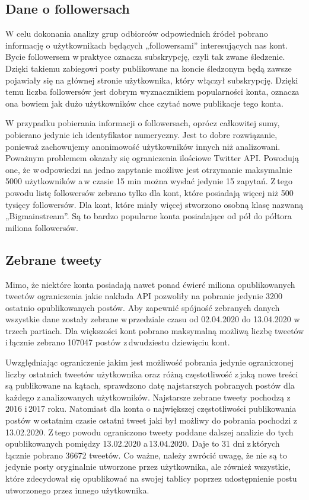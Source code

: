 \subsection{Dane o followersach}
W celu dokonania analizy grup odbiorców odpowiednich źródeł pobrano informację o użytkownikach będących „followersami” interesujących nas kont. Bycie followersem w\,praktyce oznacza subskrypcję, czyli tak zwane śledzenie. Dzięki takiemu zabiegowi posty publikowane na koncie śledzonym będą zawsze pojawiały się na głównej stronie użytkownika, który włączył subskrypcję. Dzięki temu liczba followersów jest dobrym wyznacznikiem popularności konta, oznacza ona bowiem jak dużo użytkowników chce czytać nowe publikacje tego konta. 
\par
W przypadku pobierania informacji o followersach, oprócz całkowitej sumy, pobierano jedynie ich identyfikator numeryczny. Jest to dobre rozwiązanie, ponieważ zachowujemy anonimowość użytkowników innych niż analizowani. Poważnym problemem okazały się ograniczenia ilościowe Twitter API. Powodują one, że w\,odpowiedzi na jedno zapytanie możliwe jest otrzymanie maksymalnie 5000 użytkowników a\,w czasie 15 min można wysłać jedynie 15 zapytań. Z\,tego powodu listę followersów zebrano tylko dla kont, które posiadają więcej niż 500 tysięcy followersów. Dla kont, które miały więcej stworzono osobną klasę nazwaną „Bigmainstream”. Są to bardzo popularne konta posiadające od pół do półtora miliona followersów. 
\subsection{Zebrane tweety}
Mimo, że niektóre konta posiadają nawet ponad ćwierć miliona opublikowanych tweetów ograniczenia jakie nakłada API pozwoliły na pobranie jedynie 3200 ostatnio opublikowanych postów. Aby zapewnić spójność zebranych danych wszystkie dane zostały zebrane w\,przedziale czasu od 02.04.2020 do 13.04.2020 w\,trzech partiach. Dla większości kont pobrano maksymalną możliwą liczbę tweetów i\,łącznie zebrano 107047 postów z\,dwudziestu dziewięciu kont. 
\par
Uwzględniając ograniczenie jakim jest możliwość pobrania jedynie ograniczonej liczby ostatnich tweetów użytkownika oraz różną częstotliwość z\,jaką nowe treści są publikowane na kątach, sprawdzono datę najstarszych pobranych postów dla każdego z\,analizowanych użytkowników. Najstarsze zebrane tweety pochodzą z\,2016 i\,2017 roku.  Natomiast dla konta o największej częstotliwości publikowania postów w\,ostatnim czasie ostatni tweet jaki był możliwy do pobrania pochodzi z\,13.02.2020. Z\,tego powodu ograniczono tweety poddane dalszej analizie do tych opublikowanych pomiędzy 13.02.2020 a\,13.04.2020. Daje to 31 dni z\,których łącznie pobrano 36672 tweetów. Co ważne, należy zwrócić uwagę, że nie są to jedynie posty oryginalnie utworzone przez użytkownika, ale również wszystkie, które zdecydował się opublikować na swojej tablicy poprzez udostępnienie postu utworzonego przez innego użytkownika. 

